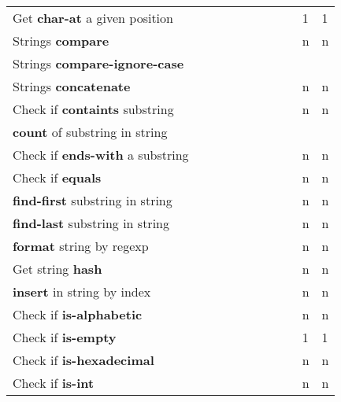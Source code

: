 \documentclass[anonymous,sigplan,review,11pt,nonacm,natbib=false]{acmart}
\begin{document}
\begin{longtable}{lllllllllll}
        Get \textbf{char-at} a given position &  &  &  &  &  & &  &  & 1 & 1 \\

        Strings \textbf{compare} &  &  &  &  &  & &  &  & n & n \\

        Strings \textbf{compare-ignore-case} &  &  &  &  &  & &  &  &  & \\

        Strings \textbf{concatenate} &  &  &  &  &  & &  &  & n & n \\

        Check if \textbf{containts} substring &  &  &  &  &  & &  &  & n & n \\

        \textbf{count} of substring in string &  &  &  &  &  & &  &  &  & \\

        Check if \textbf{ends-with} a substring &  &  &  &  &  & &  &  & n & n \\

        Check if \textbf{equals} &  &  &  &  &  & &  &  & n & n \\

        \textbf{find-first} substring in string &  &  &  &  &  & &  &  & n & n \\

        \textbf{find-last} substring in string &  &  &  &  &  & &  &  & n & n \\

        \textbf{format} string by regexp &  &  &  &  &  & &  &  & n & n \\

        Get string \textbf{hash} &  &  &  &  &  & &  &  & n & n \\

        \textbf{insert} in string by index &  &  &  &  &  & &  &  & n & n \\

        Check if \textbf{is-alphabetic} &  &  &  &  &  & &  &  & n & n \\

        Check if \textbf{is-empty} &  &  &  &  &  & &  &  & 1 & 1 \\

        Check if \textbf{is-hexadecimal} &  &  &  &  &  & &  &  & n & n \\

        Check if \textbf{is-int} &  &  &  &  &  & &  &  & n & n \\


\end{longtable}
\end{document}
